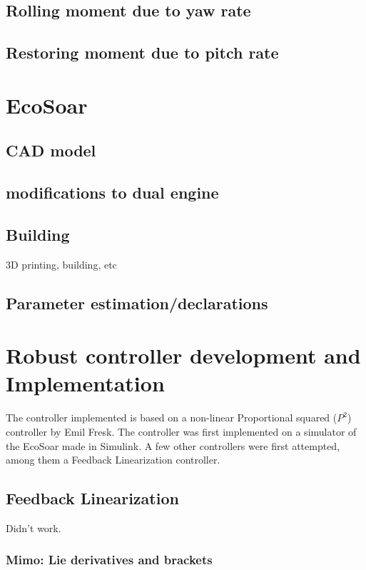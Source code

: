 \documentclass{article}
\begin{document}
\subsection{Rolling moment due to yaw rate}


\subsection{Restoring moment due to pitch rate}









\section{EcoSoar}
\subsection{CAD model}
\subsection{modifications to dual engine}
\subsection{Building}
3D printing, building, etc
\subsection{Parameter estimation/declarations}

\section{\textbf{Robust controller development and Implementation}}

The controller implemented is based on a non-linear Proportional squared ($P^2$) controller by Emil Fresk\cite{P2}.
The controller was first implemented on a simulator of the EcoSoar made in Simulink.
A few other controllers were first attempted, among them a Feedback Linearization controller.

\subsection{Feedback Linearization}
Didn't work.
\subsubsection{Mimo: Lie derivatives and brackets}
\end{document}
